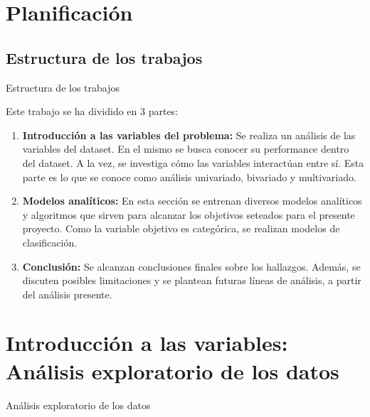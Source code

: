 \documentclass[pdf]{beamer}
\begin{document}
\section{Planificación}

    \subsection*{Estructura de los trabajos}

\begin{frame}{Estructura de los trabajos}

    Este trabajo se ha dividido en 3 partes:
    \begin{enumerate}
        \item \textbf{Introducción a las variables del problema:} Se realiza un análisis de las variables del dataset. En el mismo se busca conocer su performance dentro del dataset. A la vez, se investiga cómo las variables interactúan entre sí. Esta parte es lo que se conoce como análisis univariado, bivariado y multivariado.
        \item \textbf{Modelos analíticos:} En esta sección se entrenan diversos modelos analíticos y algoritmos que sirven para alcanzar los objetivos seteados para el presente proyecto. Como la variable objetivo es categórica, se realizan modelos de clasificación.
        \item \textbf{Conclusión:} Se alcanzan conclusiones finales sobre los hallazgos. Además, se discuten posibles limitaciones y se plantean futuras líneas de análisis, a partir del análisis presente.
    \end{enumerate}

\end{frame}

\section{Introducción a las variables: Análisis exploratorio de los datos}

\begin{frame}{Análisis exploratorio de los datos}
    
\end{frame}
 
\end{document}
